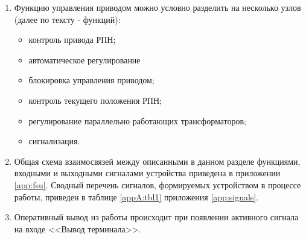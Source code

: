 \begin{enumerate}[label=\arabic{section}.\arabic{subsection}.\arabic*, labelsep=4pt, leftmargin=0pt, itemindent=57pt]
\begin{itemize}
    \item
    в ручном режиме длительность команды управления (задаваемая уставкой) должна быть больше продолжительности переключения;
    \item
    в автоматическом режиме управления команда управления удерживается до возвращения напряжения в зону нечувствительности.
\end{itemize}
\item
Функцию управления приводом можно условно разделить на несколько узлов (далее по тексту - функций):
\begin{itemize}
    \item
    контроль привода РПН;
    \item
    автоматическое регулирование
    \item
    блокировка управления приводом;
    \item
    контроль текущего положения РПН;
    \item
    регулирование параллельно работающих трансформаторов;
    \item
    сигнализация.
\end{itemize}

\item
Общая схема взаимосвязей между описанными в данном разделе функциями, входными и выходными сигналами устройства приведена в приложении \ref{app:fsu}.
Сводный перечень сигналов, формируемых устройством в процессе работы, приведен в таблице \ref{appA:tbl1} приложения \ref{app:signals}.
\item
Оперативный вывод из работы происходит при появлении активного сигнала на входе <<Вывод терминала>>.
\end{enumerate}